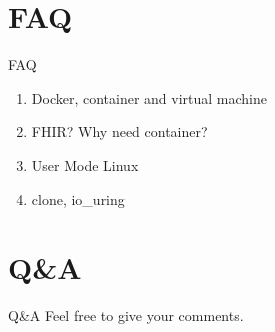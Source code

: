 \documentclass{beamer}
\begin{document}
\section{FAQ}
\begin{frame}{FAQ}
    \begin{enumerate}
        \item Docker, container and virtual machine
        \item FHIR? Why need container?
        \item User Mode Linux
        \item clone, io\_uring
    \end{enumerate}
\end{frame}

\section{Q\&A}
\begin{frame}{Q\&A}
    \centering
    \Large Feel free to give your comments.
\end{frame}
\end{document}

